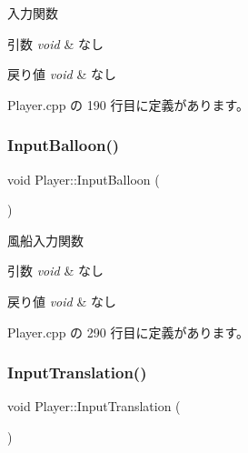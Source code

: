 入力関数 


\begin{DoxyParams}{引数}
{\em void} & なし \\
\hline
\end{DoxyParams}

\begin{DoxyRetVals}{戻り値}
{\em void} & なし \\
\hline
\end{DoxyRetVals}


 Player.\+cpp の 190 行目に定義があります。

\mbox{\label{class_player_a0b738799f41b3b5819d32e30263ff5de}} 
\subsubsection{\texorpdfstring{Input\+Balloon()}{InputBalloon()}}
{\footnotesize\ttfamily void Player\+::\+Input\+Balloon (\begin{DoxyParamCaption}{ }\end{DoxyParamCaption})\hspace{0.3cm}{\ttfamily [private]}}



風船入力関数 


\begin{DoxyParams}{引数}
{\em void} & なし \\
\hline
\end{DoxyParams}

\begin{DoxyRetVals}{戻り値}
{\em void} & なし \\
\hline
\end{DoxyRetVals}


 Player.\+cpp の 290 行目に定義があります。

\mbox{\label{class_player_a0b8e7f60389c0d55a733b163d9b26a4d}} 
\subsubsection{\texorpdfstring{Input\+Translation()}{InputTranslation()}}
{\footnotesize\ttfamily void Player\+::\+Input\+Translation (\begin{DoxyParamCaption}{ }\end{DoxyParamCaption})\hspace{0.3cm}{\ttfamily [private]}}



